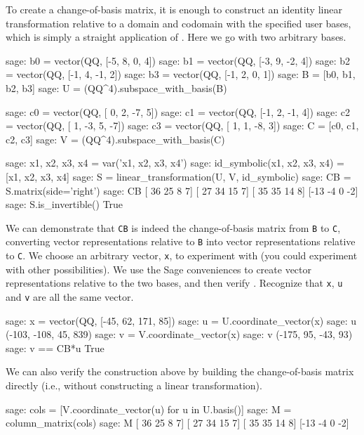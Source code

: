 To create a change-of-basis matrix, it is enough to construct an identity linear transformation relative to a domain and codomain with the specified user bases, which is simply a straight application of .  Here we go with two arbitrary bases.
%
\begin{sageexample}
sage: b0 = vector(QQ, [-5, 8,  0, 4])
sage: b1 = vector(QQ, [-3, 9, -2, 4])
sage: b2 = vector(QQ, [-1, 4, -1, 2])
sage: b3 = vector(QQ, [-1, 2,  0, 1])
sage: B = [b0, b1, b2, b3]
sage: U = (QQ^4).subspace_with_basis(B)

sage: c0 = vector(QQ, [ 0,  2, -7,  5])
sage: c1 = vector(QQ, [-1,  2, -1,  4])
sage: c2 = vector(QQ, [ 1, -3,  5, -7])
sage: c3 = vector(QQ, [ 1,  1, -8,  3])
sage: C = [c0, c1, c2, c3]
sage: V = (QQ^4).subspace_with_basis(C)

sage: x1, x2, x3, x4 = var('x1, x2, x3, x4')
sage: id_symbolic(x1, x2, x3, x4) = [x1, x2, x3, x4]
sage: S = linear_transformation(U, V, id_symbolic)
sage: CB = S.matrix(side='right')
sage: CB
[ 36  25   8   7]
[ 27  34  15   7]
[ 35  35  14   8]
[-13  -4   0  -2]
sage: S.is_invertible()
True
\end{sageexample}
%
We can demonstrate that \verb?CB? is indeed the change-of-basis matrix from \verb?B? to \verb?C?, converting vector representations relative to \verb?B? into vector representations relative to \verb?C?.  We choose an arbitrary vector, \verb?x?, to experiment with (you could experiment with other possibilities).  We use the Sage conveniences to create vector representations relative to the two bases, and then verify .  Recognize that \verb?x?, \verb?u? and \verb?v? are all the same vector.
%
\begin{sageexample}
sage: x = vector(QQ, [-45, 62, 171, 85])
sage: u = U.coordinate_vector(x)
sage: u
(-103, -108, 45, 839)
sage: v = V.coordinate_vector(x)
sage: v
(-175, 95, -43, 93)
sage: v == CB*u
True
\end{sageexample}
%
We can also verify the construction above by building the change-of-basis matrix directly (i.e., without constructing a linear transformation).
%
\begin{sageexample}
sage: cols = [V.coordinate_vector(u) for u in U.basis()]
sage: M = column_matrix(cols)
sage: M
[ 36  25   8   7]
[ 27  34  15   7]
[ 35  35  14   8]
[-13  -4   0  -2]
\end{sageexample}
%
\begin{sageverbatim}
\end{sageverbatim}
%

